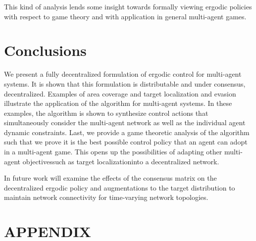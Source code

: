 \documentclass[letterpaper, 10 pt, conference]{ieeeconf}  %
\begin{document}
This kind of analysis lends some insight towards formally viewing ergodic policies with respect to game theory and with application in general multi-agent games.


\section{Conclusions}
\label{sec:conclusions}
We present a fully decentralized formulation of ergodic control for multi-agent systems.
It is shown that this formulation is distributable and under consensus, decentralized. 
Examples of area coverage and target localization and evasion illustrate the application of the algorithm for multi-agent systems.
In these examples, the algorithm is shown to synthesize control actions that simultaneously consider the multi-agent network as well as the individual agent dynamic constraints.
Last, we provide a game theoretic analysis of the algorithm such that we prove it is the best possible control policy that an agent can adopt in a multi-agent game.
This opens up the possibilities of adapting other multi-agent objectives\textemdash such as target localization\textemdash into a decentralized network.


In future work will examine the effects of the consensus matrix on the decentralized ergodic policy and augmentations to the target distribution to maintain network connectivity for time-varying network topologies.








\section*{APPENDIX}
\end{document}
